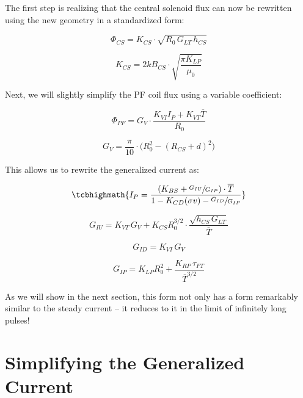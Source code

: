 The first step is realizing that the central solenoid flux can now be rewritten using the new geometry in a standardized form:

\begin{equation}
	\Phi_{CS} = K_{CS} \cdot \sqrt{ R_0 \, G_{LT} \, h_{CS} }
\end{equation}

\begin{equation}
	K_{CS} = 2 k B_{CS} \cdot \sqrt{ \frac{ \pi K_{LP} }{ \mu_0 } }
\end{equation}

Next, we will slightly simplify the PF coil flux using a  variable coefficient:

\begin{equation}
	\Phi_{PF} = G_V \cdot \frac{ K_{VI} I_P + K_{VT} \overline T }{R_0}
\end{equation}

\begin{equation}
	G_V = \frac{ \pi }{ 10 } \cdot \big( R_0^2 - \left( R_{CS} + d \right) ^2 \big)
\end{equation}

This allows us to rewrite the generalized current as:

\begin{equation}
	\label{eq:gen_ip}
	\tcbhighmath{
	I_P = \frac{ \left( K_{BS} + \sfrac{ G_{IU} }{ G_{IP} } \right) \cdot \overline T }{ 1 - K_{CD} ( \sigma v ) - \sfrac{ G_{ID} }{ G_{IP} } }
	}
\end{equation}

\begin{equation}
	G_{IU} = K_{VT} \, G_V + K_{CS} R_0^{3/2} \cdot \frac{ \sqrt{ h_{CS} \, G_{LT} } }{ \overline T }
\end{equation}

\begin{equation}
	G_{ID} = K_{VI} \, G_V
\end{equation}

\begin{equation}
	\label{eq:gip}
	G_{IP} = K_{LP} R_0^2 + \frac{ K_{RP} \, \tau_{FT} }{ \overline T ^ {3/2} }
\end{equation}

As we will show in the next section, this form not only has a form remarkably similar to the steady current -- it reduces to it in the limit of infinitely long pulses!

\section{Simplifying the Generalized Current}

